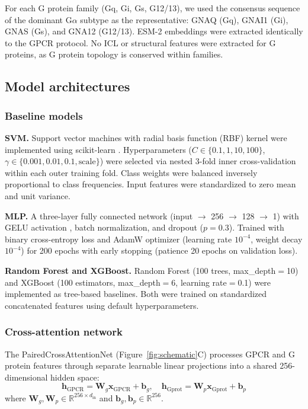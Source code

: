 \documentclass[11pt,a4paper]{article}
\begin{document}
For each G protein family (Gq, Gi, Gs, G12/13), we used the consensus sequence of the dominant G$\alpha$ subtype as the representative: GNAQ (Gq), GNAI1 (Gi), GNAS (Gs), and GNA12 (G12/13). ESM-2 embeddings were extracted identically to the GPCR protocol. No ICL or structural features were extracted for G proteins, as G protein topology is conserved within families.

\subsection{Model architectures}

\subsubsection{Baseline models}

\textbf{SVM.} Support vector machines with radial basis function (RBF) kernel were implemented using scikit-learn \cite{pedregosa2011scikit}. Hyperparameters ($C \in \{0.1, 1, 10, 100\}$, $\gamma \in \{0.001, 0.01, 0.1, \text{scale}\}$) were selected via nested 3-fold inner cross-validation within each outer training fold. Class weights were balanced inversely proportional to class frequencies. Input features were standardized to zero mean and unit variance.

\textbf{MLP.} A three-layer fully connected network (input $\rightarrow$ 256 $\rightarrow$ 128 $\rightarrow$ 1) with GELU activation \cite{hendrycks2016gaussian}, batch normalization, and dropout ($p=0.3$). Trained with binary cross-entropy loss and AdamW optimizer \cite{loshchilov2019decoupled} (learning rate $10^{-4}$, weight decay $10^{-4}$) for 200 epochs with early stopping (patience 20 epochs on validation loss).

\textbf{Random Forest and XGBoost.} Random Forest (100 trees, max\_depth$=$10) and XGBoost \cite{chen2016xgboost} (100 estimators, max\_depth$=$6, learning rate$=$0.1) were implemented as tree-based baselines. Both were trained on standardized concatenated features using default hyperparameters.

\subsubsection{Cross-attention network}

The PairedCrossAttentionNet (Figure~\ref{fig:schematic}C) processes GPCR and G protein features through separate learnable linear projections into a shared 256-dimensional hidden space:
\begin{equation}
\mathbf{h}_{\text{GPCR}} = \mathbf{W}_g \mathbf{x}_{\text{GPCR}} + \mathbf{b}_g, \quad
\mathbf{h}_{\text{Gprot}} = \mathbf{W}_p \mathbf{x}_{\text{Gprot}} + \mathbf{b}_p
\end{equation}
where $\mathbf{W}_g, \mathbf{W}_p \in \mathbb{R}^{256 \times d_{\text{in}}}$ and $\mathbf{b}_g, \mathbf{b}_p \in \mathbb{R}^{256}$.
\end{document}
